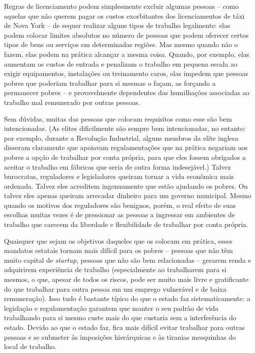 Regras de licenciamento podem simplesmente excluir algumas pessoas -- como aquelas que não querem pagar os custos exorbitantes dos licenciamentos de táxi de Nova York -- de sequer realizar alguns tipos de trabalho legalmente: elas podem colocar limites absolutos no número de pessoas que podem oferecer certos tipos de bens ou serviços em determinadas regiões. Mas mesmo quando não o fazem, elas podem na prática alcançar a mesma coisa. Quando, por exemplo, elas aumentam os custos de entrada e penalizam o trabalho em pequena escala ao exigir equipamentos, instalações ou treinamento caros, elas impedem que pessoas pobres que poderiam trabalhar para si mesmas o façam, as forçando a permanecer pobres -- e provavelmente dependentes das humilhações associadas ao trabalho mal remunerado por outras pessoas.

Sem dúvidas, muitas das pessoas que colocam requisitos como esse são bem intencionadas. (As elites dificilmente são sempre bem intencionadas, no entanto: por exemplo, durante a Revolução Industrial, alguns membros da elite inglesa disseram claramente que apoiavam regulamentações que na prática negariam aos pobres a opção de trabalhar por conta própria, para que eles fossem obrigados a aceitar o trabalho em fábricas que seria de outra forma indesejável.) Talvez burocratas, reguladores e legisladores queiram tornar a vida econômica mais ordenada. Talvez eles acreditem ingenuamente que estão ajudando os pobres. Ou talvez eles apenas queiram arrecadar dinheiro para um governo municipal. Mesmo quando os motivos dos reguladores são benignos, porém, o real efeito de suas escolhas muitas vezes é de pressionar as pessoas a ingressar em ambientes de trabalho que carecem da liberdade e flexibilidade de trabalhar por conta própria.

Quaisquer que sejam os objetivos daqueles que os colocam em prática, esses mandatos estatais tornam mais difícil para os pobres -- pessoas que não têm muito capital de \emph{startup}, pessoas que não são bem relacionadas -- gerarem renda e adquirirem experiência de trabalho (especialmente ao trabalharem para si mesmos, o que, apesar de todos os riscos, pode ser muito mais livre e gratificante do que trabalhar para outra pessoa em um emprego vulnerável e de baixa remuneração). Isso tudo é bastante típico do que o estado faz sistematicamente: a legislação e regulamentação garantem que manter o seu padrão de vida trabalhando para si mesmo custe mais do que custaria sem a interferência do estado. Devido ao que o estado faz, fica mais difícil evitar trabalhar para outras pessoas e se submeter às imposições hierárquicas e às tiranias mesquinhas do local de trabalho.

